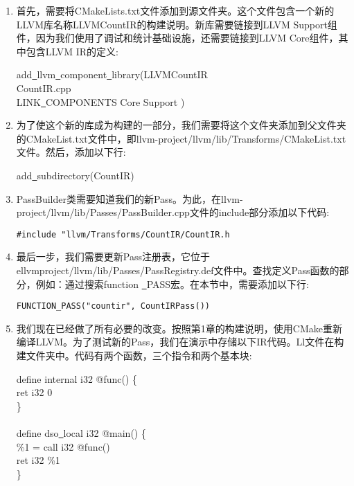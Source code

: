 \begin{enumerate}
	\item 首先，需要将CMakeLists.txt文件添加到源文件夹。这个文件包含一个新的LLVM库名称LLVMCountIR的构建说明。新库需要链接到LLVM Support组件，因为我们使用了调试和统计基础设施，还需要链接到LLVM Core组件，其中包含LLVM IR的定义:
	\begin{tcolorbox}[colback=white,colframe=black]
		add\underline{~}llvm\underline{~}component\underline{~}library(LLVMCountIR \\
		\hspace*{0.5cm}CountIR.cpp \\
		\hspace*{0.5cm}LINK\underline{~}COMPONENTS Core Support )
	\end{tcolorbox}
	
	\item 为了使这个新的库成为构建的一部分，我们需要将这个文件夹添加到父文件夹的CMakeList.txt文件中，即llvm-project/llvm/lib/Transforms/CMakeList.txt文件。然后，添加以下行:
	\begin{tcolorbox}[colback=white,colframe=black]
		add\underline{~}subdirectory(CountIR)
	\end{tcolorbox}
	
	\item PassBuilder类需要知道我们的新Pass。为此，在llvm-project/llvm/lib/Passes/PassBuilder.cpp文件的include部分添加以下代码:
	\begin{lstlisting}[caption={}]
		#include "llvm/Transforms/CountIR/CountIR.h
	\end{lstlisting}
	
	\item 最后一步，我们需要更新Pass注册表，它位于ellvmproject/llvm/lib/Passes/PassRegistry.def文件中。查找定义Pass函数的部分，例如：通过搜索function \underline{~}PASS宏。在本节中，需要添加以下行:
	\begin{lstlisting}[caption={}]
		FUNCTION_PASS("countir", CountIRPass())
	\end{lstlisting}
	
	\item 我们现在已经做了所有必要的改变。按照第1章的构建说明，使用CMake重新编译LLVM。为了测试新的Pass，我们在演示中存储以下IR代码。Ll文件在构建文件夹中。代码有两个函数，三个指令和两个基本块:
	\begin{tcolorbox}[colback=white,colframe=black]
		define internal i32 @func() \{ \\
		\hspace*{0.5cm}ret i32 0 \\
		\} \\
		\\
		define dso\underline{~}local i32 @main() \{ \\
		\hspace*{0.5cm}	\%1 = call i32 @func() \\
		\hspace*{0.5cm}	ret i32 \%1 \\
		\}
	\end{tcolorbox}
	

\end{enumerate}
